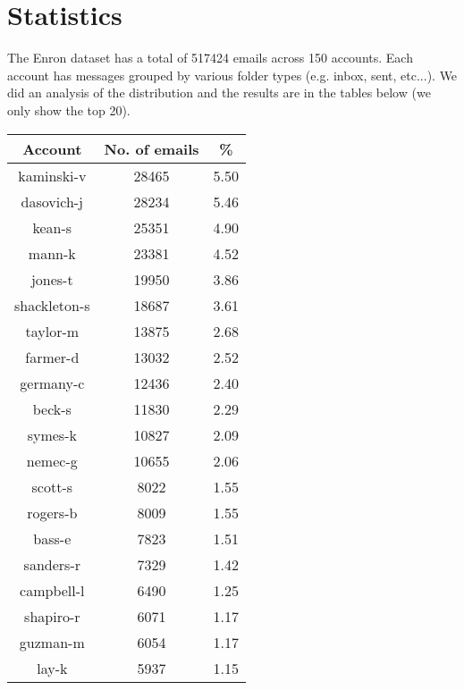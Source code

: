 \documentclass[senior,oneside]{UIUC}
\begin{document}
\section{Statistics}

The Enron dataset has  a total of 517424 emails across 150 accounts. Each account has messages grouped by various folder types (e.g. inbox, sent, etc...). We did an analysis of the distribution and the results are in the tables below (we only show the top 20).

\begin{table}
\parbox{.45\linewidth}{
\begin{tabular}{c c c }
\hline \hline
Account & No. of emails & \% \\ [0.5ex]
\hline
kaminski-v & 28465 & 5.50 \\
dasovich-j & 28234 & 5.46 \\
kean-s & 25351 & 4.90 \\
mann-k & 23381 & 4.52 \\
jones-t & 19950 & 3.86 \\
shackleton-s & 18687 & 3.61 \\
taylor-m & 13875 & 2.68 \\
farmer-d & 13032 & 2.52 \\
germany-c & 12436 & 2.40 \\
beck-s & 11830 & 2.29 \\
symes-k & 10827 & 2.09 \\
nemec-g & 10655 & 2.06 \\
scott-s & 8022 & 1.55 \\
rogers-b & 8009 & 1.55 \\
bass-e & 7823 & 1.51 \\
sanders-r & 7329 & 1.42 \\
campbell-l & 6490 & 1.25 \\
shapiro-r & 6071 & 1.17 \\
guzman-m & 6054 & 1.17 \\
lay-k & 5937 & 1.15 


\end{tabular}}
\end{table}
\end{document}
